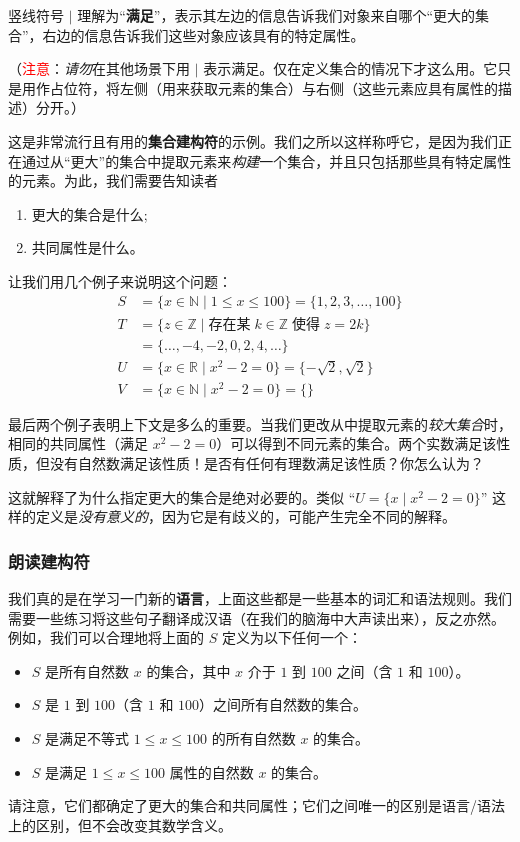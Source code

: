 竖线符号 $\mid$ 理解为``\textbf{满足}''，表示其左边的信息告诉我们对象来自哪个``更大的集合''，右边的信息告诉我们这些对象应该具有的特定属性。

（\textcolor{red}{注意}：\emph{请勿}在其他场景下用 $\mid$ 表示满足。仅在定义集合的情况下才这么用。它只是用作占位符，将左侧（用来获取元素的集合）与右侧（这些元素应具有属性的描述）分开。）

这是非常流行且有用的\textbf{集合建构符}的示例。我们之所以这样称呼它，是因为我们正在通过从``更大''的集合中提取元素来\emph{构建}一个集合，并且只包括那些具有特定属性的元素。为此，我们需要告知读者
\begin{enumerate}[label=(\arabic*)]
    \item 更大的集合是什么;
    \item 共同属性是什么。
\end{enumerate}
让我们用几个例子来说明这个问题：
\begin{align*}
    S &= \{x \in \mathbb{N} \mid 1 \le x \le 100\} = \{1, 2, 3, \dots , 100\} \\
    T &= \{z \in \mathbb{Z} \mid \text{存在某}\; k \in \mathbb{Z} \;\text{使得}\; z = 2k\} \\
      &= \{\dots , -4, -2, 0, 2, 4, \dots\} \\
    U &= \{x \in \mathbb{R} \mid x^2 - 2 = 0\} = \{-\sqrt{2}, \sqrt{2}\}\\
    V &= \{x \in \mathbb{N} \mid x^2 - 2 = 0\}= \{ \}
\end{align*}

最后两个例子表明上下文是多么的重要。当我们更改从中提取元素的\emph{较大集合}时，相同的共同属性（满足 $x^2 -2 = 0$）可以得到不同元素的集合。两个实数满足该性质，但没有自然数满足该性质！是否有任何有理数满足该性质？你怎么认为？

这就解释了为什么指定更大的集合是绝对必要的。类似 ``$U = \{x \mid x^2 - 2 = 0\}$'' 这样的定义是\emph{没有意义的}，因为它是有歧义的，可能产生完全不同的解释。

\subsubsection*{朗读建构符}

我们真的是在学习一门新的\textbf{语言}，上面这些都是一些基本的词汇和语法规则。我们需要一些练习将这些句子翻译成汉语（在我们的脑海中大声读出来），反之亦然。例如，我们可以合理地将上面的 $S$ 定义为以下任何一个：

\begin{itemize}
    \item $S$ 是所有自然数 $x$ 的集合，其中 $x$ 介于 $1$ 到 $100$ 之间（含 $1$ 和 $100$）。
    \item $S$ 是 $1$ 到 $100$（含 $1$ 和 $100$）之间所有自然数的集合。
    \item $S$ 是满足不等式 $1 \le x \le 100$ 的所有自然数 $x$ 的集合。
    \item $S$ 是满足 $1 \le x \le 100$ 属性的自然数 $x$ 的集合。
\end{itemize}
请注意，它们都确定了更大的集合和共同属性；它们之间唯一的区别是语言/语法上的区别，但不会改变其数学含义。

